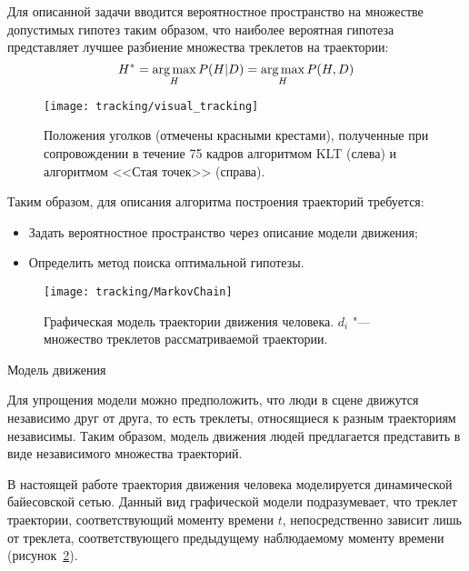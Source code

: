 Для описанной задачи вводится вероятностное пространство на множестве допустимых гипотез таким образом, что наиболее вероятная гипотеза представляет лучшее разбиение множества треклетов на траектории:
\begin{equation}
	H^* = \operatorname*{arg\,max}_H P(H|D) = \operatorname*{arg\,max}_H P(H, D)
	\label{sec::tracking::opt_hyp}
\end{equation}

\begin{figure}[t]
	\begin{center}
		\texttt{[image: tracking/visual\_tracking]}
		\caption{Положения уголков (отмечены красными крестами), полученные при сопровождении в течение 75 кадров алгоритмом KLT (слева) и алгоритмом <<Стая точек>> (справа).}
		\label{sec::tracking::fig::visual_tracking}
	\end{center}
\end{figure}

Таким образом, для описания алгоритма построения траекторий требуется:
\begin{itemize}
	\item Задать вероятностное пространство через описание модели движения;
	\item Определить метод поиска оптимальной гипотезы.
\end{itemize}

\begin{figure}[t]
	\begin{center}
		\texttt{[image: tracking/MarkovChain]}
		\caption{Графическая модель траектории движения человека. ${d_i}$ "--- множество треклетов рассматриваемой траектории.}
		\label{sec::tracking::fig::markov_chain}
	\end{center}
\end{figure}

Модель движения

Для упрощения модели можно предположить, что люди в сцене движутся независимо друг от друга, то есть треклеты, относящиеся к разным траекториям независимы. Таким образом, модель движения людей предлагается представить в виде независимого множества траекторий.

В настоящей работе траектория движения человека моделируется динамической байесовской сетью. Данный вид графической модели подразумевает, что треклет траектории, соответствующий моменту времени $t$, непосредственно зависит лишь от треклета, соответствующего предыдущему наблюдаемому моменту времени (рисунок~\ref{sec::tracking::fig::markov_chain}).

